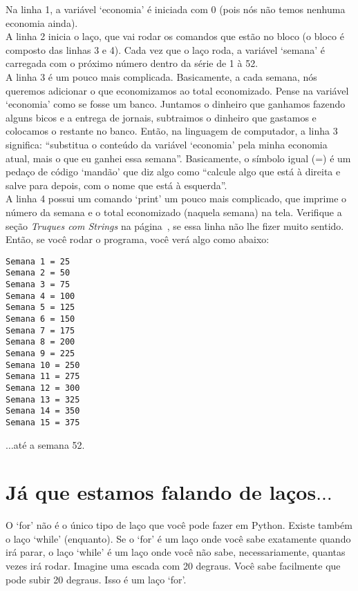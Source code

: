 Na linha 1, a variável `economia' é iniciada com 0 (pois nós não temos nenhuma economia ainda).\\
A linha 2 inicia o laço, que vai rodar os comandos que estão no bloco (o bloco é composto das linhas 3 e 4). Cada vez que o laço roda, a variável `semana' é carregada com o próximo número dentro da série de 1 à 52.\\
A linha 3 é um pouco mais complicada. Basicamente, a cada semana, nós queremos adicionar o que economizamos ao total economizado. Pense na variável `economia' como se fosse um banco. Juntamos o dinheiro que ganhamos fazendo alguns bicos e a entrega de jornais, subtraimos o dinheiro que gastamos e colocamos o restante no banco. Então, na linguagem de computador, a linha 3 significa: ``substitua o conteúdo da variável `economia' pela minha economia atual, mais o que eu ganhei essa semana''. Basicamente, o símbolo igual (=) é um pedaço de código `mandão' que diz algo como ``calcule algo que está à direita e salve para depois, com o nome que está à esquerda''.\\
A linha 4 possui um comando `print' um pouco mais complicado, que imprime o número da semana e o total economizado (naquela semana) na tela. Verifique a seção \emph{Truques com Strings} na página~\pageref{trickswithstrings}, se essa linha não lhe fizer muito sentido. Então, se você rodar o programa, você verá algo como abaixo:

\begin{listing}
\begin{verbatim}
Semana 1 = 25
Semana 2 = 50
Semana 3 = 75
Semana 4 = 100
Semana 5 = 125
Semana 6 = 150
Semana 7 = 175
Semana 8 = 200
Semana 9 = 225
Semana 10 = 250
Semana 11 = 275
Semana 12 = 300
Semana 13 = 325
Semana 14 = 350
Semana 15 = 375
\end{verbatim}
\end{listing}

$\ldots$até a semana 52.

\section{Já que estamos falando de laços$\ldots$}

O `for' não é o único tipo de laço que você pode fazer em Python. Existe também o laço `while' (enquanto). Se o `for' é um laço onde você sabe exatamente quando irá parar, o laço `while' é um laço onde você não sabe, necessariamente, quantas vezes irá rodar. Imagine uma escada com 20 degraus. Você sabe facilmente que pode subir 20 degraus. Isso é um laço `for'.

